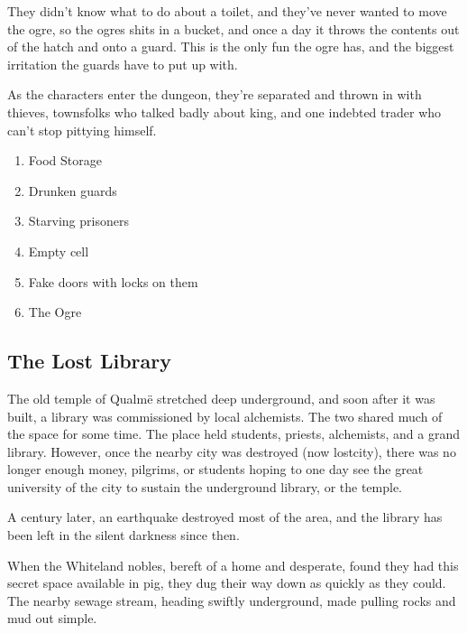 \begin{multicols}{2}
\begin{boxtext}
\end{boxtext}

\noindent

They didn't know what to do about a toilet, and they've never wanted to move the ogre, so the ogres shits in a bucket, and once a day it throws the contents out of the hatch and onto a guard.
This is the only fun the ogre has, and the biggest irritation the guards have to put up with.

As the characters enter the dungeon, they're separated and thrown in with thieves, townsfolks who talked badly about \gls{king}, and one indebted trader who can't stop pittying himself.

\begin{enumerate}

	\item{Food Storage}
	\item{Drunken guards}
	\item{Starving prisoners}
	\item{Empty cell}
	\item{Fake doors with locks on them}
	\item{The Ogre}

\end{enumerate}



\subsection{The Lost Library}\label{sewers}\setcounter{list}{0}

The old temple of Qualm\"{e} stretched deep underground, and soon after it was built, a library was commissioned by local alchemists.
The two shared much of the space for some time.
The place held students, priests, alchemists, and a grand library.
However, once the nearby city was destroyed (now \gls{lostcity}), there was no longer enough money, pilgrims, or students hoping to one day see the great university of the city to sustain the underground library, or the temple.

A century later, an earthquake destroyed most of the area, and the library has been left in the silent darkness since then.

When the Whiteland nobles, bereft of a home and desperate, found they had this secret space available in \gls{pig}, they dug their way down as quickly as they could.  The nearby sewage stream, heading swiftly underground, made pulling rocks and mud out simple.


\end{multicols}
